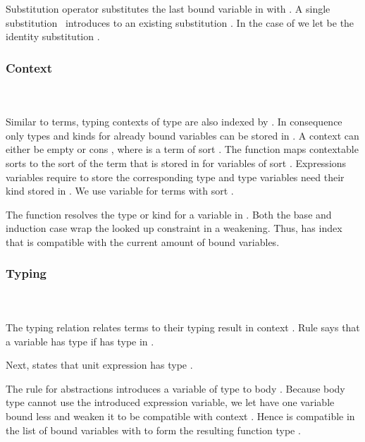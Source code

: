 \noindent Substitution operator  \Data{[}  \Data{]} substitutes the last bound variable in  with .
\Fsubs
A single substitution \Fsinglesub\ introduces  to an existing substitution . In the case of \Data{\_[\_]} we let  be the identity substitution \Fidsub.

\subsubsection{Context}\hfill\\\\
Similar to terms, typing contexts  of type   are also indexed by . In consequence only types and kinds for already bound variables can be stored in .
\FCtx
A context can either be empty  or cons   , where  is a term of sort  . 
\noindent The function  maps contextable sorts  to the sort of the term that is stored in  for variables of sort .
\Fkind
Expressions variables require  to store the corresponding type and type variables need their kind stored in . We use variable  for terms with sort  . 

\noindent The  function resolves the type or kind for a variable  in .
\Flookup
Both the base and induction case wrap the looked up constraint in a weakening. Thus,  has index  that is compatible with the current amount of bound variables.

\subsubsection{Typing}\hfill\\\\
The typing relation    \Data{:}  relates terms  to their typing result  in context .
\FTyping
Rule  says that a variable   has type  if  has type  in . 

\noindent Next,  states that unit expression  has type . 

\noindent The rule for abstractions  introduces a variable of type  to body . 
Because body type  cannot use the introduced expression variable, we let  have one variable bound less and weaken it to be compatible with context   . 
Hence  is compatible in the list of bound variables with  to form the resulting function type   . 

